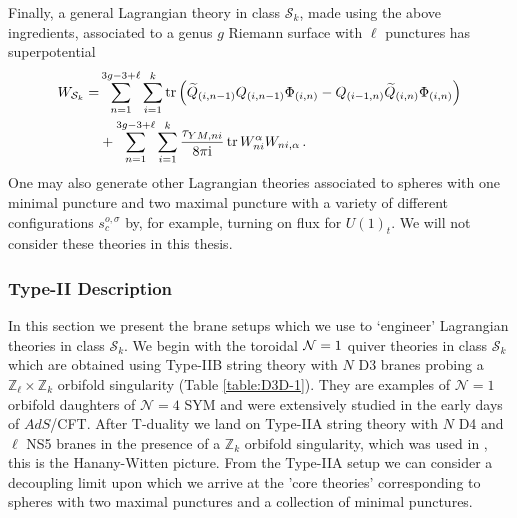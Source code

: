 \documentclass[main.tex]{subfiles}
\begin{document}
Finally, a general Lagrangian theory in class $\mathcal{S}_k$, made using the above ingredients, associated to a genus $g$ Riemann surface with $\ell$ punctures has superpotential
\begin{equation}\label{eqn:Sksuperpotential}
\begin{aligned}
W_{\mathcal{S}_k}=&\sum_{n=1}^{3g-3+\ell}\sum_{i=1}^k\operatorname{tr}\left( \widetilde{Q}_{(i,n-1)}Q_{(i,n-1)}\Phi_{(i,n)}-Q_{(i-1,n)}\widetilde{Q}_{(i,n)}\Phi_{(i,n)}\right)\\
&+\sum_{n=1}^{3g-3+\ell}\sum_{i=1}^k\frac{\tau_{YM,ni }}{8\pi\mathrm{i}}\operatorname{tr} W^{\alpha}_{ni}W_{ni,\alpha}\,.
\end{aligned}
\end{equation}
One may also generate other Lagrangian theories associated to spheres with one minimal puncture and two maximal puncture with a variety of different configurations $s_c^{o,\sigma}$ by, for example, turning on flux for $U(1)_t$.  We will not consider these theories in this thesis.
\subsubsection{Type-II Description}\label{sec:stringsetup}
In this section we present the brane setups which we use to `engineer' Lagrangian theories in class $\mathcal{S}_k$.
We begin with the toroidal $\mathcal{N}=1$ quiver theories in class $\mathcal{S}_k$  which are obtained using Type-IIB string theory with $N$ D3 branes probing a $\mathbb{Z}_\ell \times \mathbb{Z}_k$  orbifold singularity (Table \ref{table:D3D-1}).
They are examples of $\mathcal{N}=1$ orbifold daughters of $\mathcal{N}=4$ SYM \cite{Kachru:1998ys,Lawrence:1998ja} and were extensively studied in the early days of $AdS$/CFT.  After T-duality we land on Type-IIA string theory with $N$ D4 and $\ell$ NS5 branes in the presence of a $\mathbb{Z}_k$ orbifold singularity, which was used in \cite{Gaiotto:2015usa}, this is the Hanany-Witten picture.  From the Type-IIA setup we can consider a decoupling limit upon which we arrive at the 'core theories' corresponding to spheres with two maximal punctures and a collection of minimal punctures.
\end{document}
